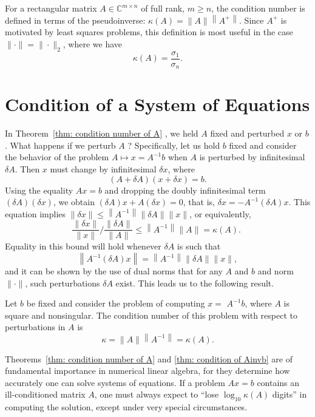 For a rectangular matrix $A \in \mathbb{C}^{m \times n}$ of full rank, $m \geq n$, the condition number is defined in terms of the pseudoinverse: $\kappa(A)=\|A\|\left\|A^{+}\right\|$. Since $A^{+}$ is motivated by least squares problems, this definition is most useful in the case $\|\cdot\|=\|\cdot\|_2$, where we have
$$
\kappa(A)=\frac{\sigma_1}{\sigma_n}. 
$$

\section{Condition of a System of Equations} 

In Theorem~\ref{thm: condition number of A} , we held $A$ fixed and perturbed $x$ or $b$. What happens if we perturb $A$ ? Specifically, let us hold $b$ fixed and consider the behavior of the problem $A \mapsto x=A^{-1} b$ when $A$ is perturbed by infinitesimal $\delta A$. Then $x$ must change by infinitesimal $\delta x$, where
$$
(A+\delta A)(x+\delta x)=b .
$$
Using the equality $A x=b$ and dropping the doubly infinitesimal term $(\delta A)(\delta x)$, we obtain $(\delta A) x+A(\delta x)=0$, that is, $\delta x=-A^{-1}(\delta A) x$. This equation implies $\|\delta x\| \leq\left\|A^{-1}\right\|\|\delta A\|\|x\|$, or equivalently,
$$
\frac{\|\delta x\|}{\|x\|} / \frac{\|\delta A\|}{\|A\|} \leq\left\|A^{-1}\right\|\|A\|=\kappa(A) \text {. }
$$
Equality in this bound will hold whenever $\delta A$ is such that
$$
\left\|A^{-1}(\delta A) x\right\|=\left\|A^{-1}\right\|\|\delta A\|\|x\|,
$$
and it can be shown by the use of dual norms that for any $A$ and $b$ and norm $\|\cdot\|$, such perturbations $\delta A$ exist. This leads us to the following result.


\begin{theorem}
\label{thm: condition of Ainvb}
Let $b$ be fixed and consider the problem of computing $x=$ $A^{-1} b$, where $A$ is square and nonsingular. The condition number of this problem with respect to perturbations in $A$ is
\begin{equation}
    \label{eq: cond of purturb A}
    \kappa=\|A\|\left\|A^{-1}\right\|=\kappa(A) .
\end{equation}
\end{theorem}


\begin{note}
    Theorems~\ref{thm: condition number of A} and \ref{thm: condition of Ainvb} are of fundamental importance in numerical linear algebra, for they determine how accurately one can solve systems of equations. If a problem $A x=b$ contains an ill-conditioned matrix $A$, one must always expect to ``lose $\log _{10} \kappa(A)$ digits'' in computing the solution, except under very special circumstances. 
\end{note}
